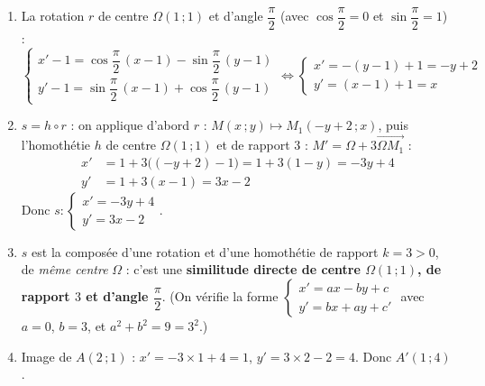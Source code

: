 \documentclass[11pt]{article}
\begin{document}
\begin{corrige}
\begin{enumerate}
\item La rotation $r$ de centre $\Omega(1\,;1)$ et d'angle $\dfrac{\pi}{2}$ (avec $\cos\dfrac{\pi}{2} = 0$ et $\sin\dfrac{\pi}{2} = 1$) :
\[ \begin{cases} x' - 1 = \cos\dfrac{\pi}{2}\,(x-1) - \sin\dfrac{\pi}{2}\,(y-1) \\ y' - 1 = \sin\dfrac{\pi}{2}\,(x-1) + \cos\dfrac{\pi}{2}\,(y-1) \end{cases} \iff \begin{cases} x' = -(y-1) + 1 = -y + 2 \\ y' = (x-1) + 1 = x \end{cases} \]
\item $s = h \circ r$ : on applique d'abord $r$ : $M(x\,;y) \mapsto M_1(-y+2\,;x)$, puis l'homothétie $h$ de centre $\Omega(1\,;1)$ et de rapport $3$ : $M' = \Omega + 3\overrightarrow{\Omega M_1}$ :
\begin{align*}
x' &= 1 + 3\big((-y+2) - 1\big) = 1 + 3(1 - y) = -3y + 4 \\
y' &= 1 + 3(x - 1) = 3x - 2
\end{align*}
Donc $s : \begin{cases} x' = -3y + 4 \\ y' = 3x - 2 \end{cases}$.
\item $s$ est la composée d'une rotation et d'une homothétie de rapport $k = 3 > 0$, de \emph{même centre} $\Omega$ : c'est une \textbf{similitude directe de centre $\Omega(1\,;1)$, de rapport $3$ et d'angle $\dfrac{\pi}{2}$}. (On vérifie la forme $\begin{cases} x' = a x - b y + c \\ y' = b x + a y + c' \end{cases}$ avec $a = 0$, $b = 3$, et $a^2 + b^2 = 9 = 3^2$.)
\item Image de $A(2\,;1)$ : $x' = -3 \times 1 + 4 = 1$, $y' = 3 \times 2 - 2 = 4$. Donc $A'(1\,;4)$.


\end{enumerate}
\end{corrige}
\end{document}
